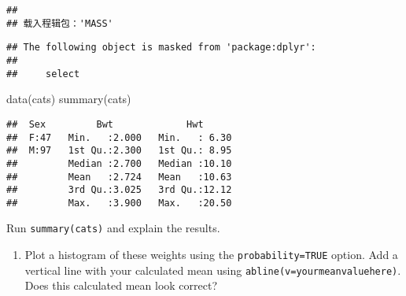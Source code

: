 \documentclass[
]{article}
\newenvironment{Shaded}{\begin{snugshade}}{\end{snugshade}}
\newcommand{\AttributeTok}[1]{\textcolor[rgb]{0.77,0.63,0.00}{#1}}
\newcommand{\ConstantTok}[1]{\textcolor[rgb]{0.00,0.00,0.00}{#1}}
\newcommand{\DecValTok}[1]{\textcolor[rgb]{0.00,0.00,0.81}{#1}}
\newcommand{\FloatTok}[1]{\textcolor[rgb]{0.00,0.00,0.81}{#1}}
\newcommand{\FunctionTok}[1]{\textcolor[rgb]{0.00,0.00,0.00}{#1}}
\newcommand{\NormalTok}[1]{#1}
\newcommand{\SpecialCharTok}[1]{\textcolor[rgb]{0.00,0.00,0.00}{#1}}
\providecommand{\tightlist}{%
  \setlength{\itemsep}{0pt}\setlength{\parskip}{0pt}}
\begin{document}
\begin{verbatim}
## 
## 载入程辑包：'MASS'
\end{verbatim}

\begin{verbatim}
## The following object is masked from 'package:dplyr':
## 
##     select
\end{verbatim}

\begin{Shaded}
\begin{Highlighting}[]
\FunctionTok{data}\NormalTok{(cats)}
\FunctionTok{summary}\NormalTok{(cats)}
\end{Highlighting}
\end{Shaded}

\begin{verbatim}
##  Sex         Bwt             Hwt       
##  F:47   Min.   :2.000   Min.   : 6.30  
##  M:97   1st Qu.:2.300   1st Qu.: 8.95  
##         Median :2.700   Median :10.10  
##         Mean   :2.724   Mean   :10.63  
##         3rd Qu.:3.025   3rd Qu.:12.12  
##         Max.   :3.900   Max.   :20.50
\end{verbatim}

Run \texttt{summary(cats)} and explain the results.

\begin{enumerate}
\def\labelenumi{\arabic{enumi}.}
\setcounter{enumi}{1}
\tightlist
\item
  Plot a histogram of these weights using the \texttt{probability=TRUE}
  option. Add a vertical line with your calculated mean using
  \texttt{abline(v=yourmeanvaluehere)}. Does this calculated mean look
  correct?
\end{enumerate}

\begin{Shaded}
\end{Shaded}
\end{document}
